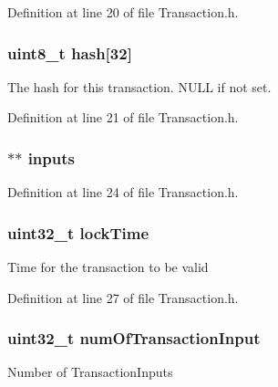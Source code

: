 Definition at line 20 of file Transaction.h.

\hypertarget{struct_m_i_transaction_a7ff9da008bf055da1f1ba994c562057d}{
\subsubsection[{hash}]{\setlength{\rightskip}{0pt plus 5cm}uint8\_\-t {\bf hash}\mbox{[}32\mbox{]}}}
\label{struct_m_i_transaction_a7ff9da008bf055da1f1ba994c562057d}
The hash for this transaction. NULL if not set. 

Definition at line 21 of file Transaction.h.

\hypertarget{struct_m_i_transaction_ad10010cd6a4f129706cf61bd0dce100f}{
\subsubsection[{inputs}]{$\ast$$\ast$ {\bf inputs}}}
\label{struct_m_i_transaction_ad10010cd6a4f129706cf61bd0dce100f}


Definition at line 24 of file Transaction.h.

\hypertarget{struct_m_i_transaction_aea4d95211b00c311b2d84c6177429162}{
\subsubsection[{lockTime}]{\setlength{\rightskip}{0pt plus 5cm}uint32\_\-t {\bf lockTime}}}
\label{struct_m_i_transaction_aea4d95211b00c311b2d84c6177429162}
Time for the transaction to be valid 

Definition at line 27 of file Transaction.h.

\hypertarget{struct_m_i_transaction_a84a553b85f92fbe799c9e927aeae4491}{
\subsubsection[{numOfTransactionInput}]{\setlength{\rightskip}{0pt plus 5cm}uint32\_\-t {\bf numOfTransactionInput}}}
\label{struct_m_i_transaction_a84a553b85f92fbe799c9e927aeae4491}
Number of TransactionInputs 

